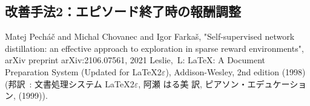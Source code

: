 \subsection{改善手法2：エピソード終了時の報酬調整}


\begin{thebibliography}{99}
Matej Pecháč and Michal Chovanec and Igor Farkaš, "Self-supervised network distillation: an effective approach to exploration in sparse reward environments", arXiv preprint arXiv:2106.07561, 2021
Leslie,~L: \LaTeX{}: {A} Document Preparation System (Updated for
  \LaTeX{}2$\varepsilon$), Addison-Wesley, 2nd edition (1998)
  (邦訳~: 文書処理システム \LaTeX{}2$\varepsilon$,
  阿瀬 はる美 訳, ピアソン・エデュケーション, (1999)).
\end{thebibliography}
